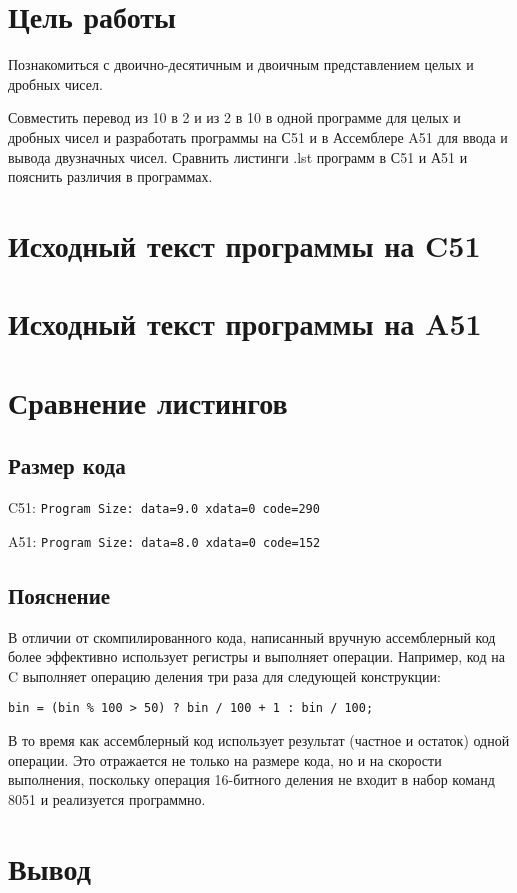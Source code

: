 \documentclass[ru, listings]{labreport}
\begin{document}
\maketitlepage

\section*{Цель работы}

Познакомиться с двоично-десятичным и двоичным представлением целых и дробных чисел.

Совместить перевод из 10 в 2 и из 2 в 10 в одной программе для целых и дробных чисел
и разработать программы на С51 и в Ассемблере A51 для ввода и вывода двузначных чисел.
Сравнить листинги .lst программ в С51 и А51 и пояснить различия в программах. 

\section*{Исходный текст программы на C51}



\section*{Исходный текст программы на A51}



\section*{Сравнение листингов}

\subsection*{Размер кода}

C51: \verb|Program Size: data=9.0 xdata=0 code=290|

A51: \verb|Program Size: data=8.0 xdata=0 code=152|

\subsection*{Пояснение}

В отличии от скомпилированного кода, написанный вручную ассемблерный код
более эффективно использует регистры и выполняет операции. Например,
код на C выполняет операцию деления три раза для следующей конструкции:

\begin{verbatim}
bin = (bin % 100 > 50) ? bin / 100 + 1 : bin / 100;
\end{verbatim}

В то время как ассемблерный код использует результат (частное и остаток) одной операции.
Это отражается не только на размере кода, но и на скорости выполнения, поскольку
операция 16-битного деления не входит в набор команд 8051 и реализуется программно.

\section*{Вывод}
\end{document}
